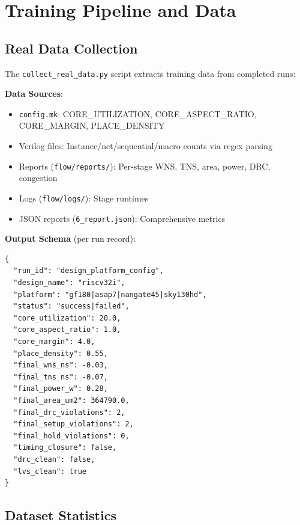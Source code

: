 \documentclass[10pt,conference]{IEEEtran}
\newcommand{\ORFS}{\text{ORFS}}
\begin{document}

\section{Training Pipeline and Data}
\label{sec:training_pipeline}

\subsection{Real Data Collection}
\label{sec:data_collection}

The \texttt{collect\_real\_data.py} script extracts training data from completed \ORFS{} runs:

\textbf{Data Sources}:
\begin{itemize}
    \item \texttt{config.mk}: CORE\_UTILIZATION, CORE\_ASPECT\_RATIO, CORE\_MARGIN, PLACE\_DENSITY
    \item Verilog files: Instance/net/sequential/macro counts via regex parsing
    \item Reports (\texttt{flow/reports/}): Per-stage WNS, TNS, area, power, DRC, congestion
    \item Logs (\texttt{flow/logs/}): Stage runtimes
    \item JSON reports (\texttt{6\_report.json}): Comprehensive \ORFS{} metrics
\end{itemize}

\textbf{Output Schema} (per run record):
\begin{verbatim}
{
  "run_id": "design_platform_config",
  "design_name": "riscv32i",
  "platform": "gf180|asap7|nangate45|sky130hd",
  "status": "success|failed",
  "core_utilization": 20.0,
  "core_aspect_ratio": 1.0,
  "core_margin": 4.0,
  "place_density": 0.55,
  "final_wns_ns": -0.03,
  "final_tns_ns": -0.07,
  "final_power_w": 0.28,
  "final_area_um2": 364790.0,
  "final_drc_violations": 2,
  "final_setup_violations": 2,
  "final_hold_violations": 0,
  "timing_closure": false,
  "drc_clean": false,
  "lvs_clean": true
}
\end{verbatim}

\subsection{Dataset Statistics}
\label{sec:dataset_stats}
\end{document}
